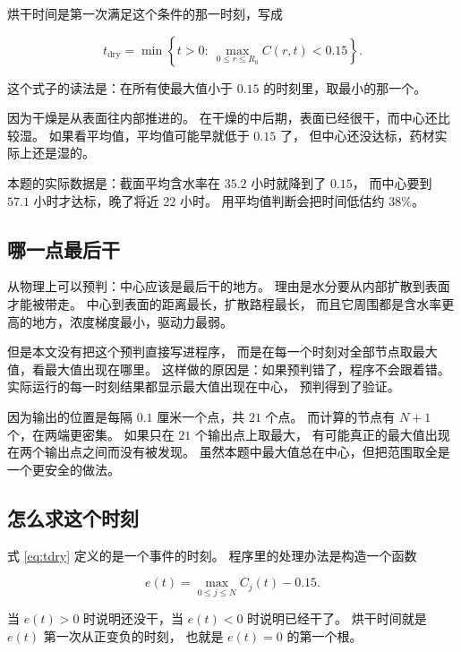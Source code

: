 烘干时间是第一次满足这个条件的那一时刻，写成

\begin{equation}
t_{\mathrm{dry}}=\min\left\{t>0:\ \max_{0\le r\le R_0}C(r,t)<0.15\right\}.
\label{eq:tdry}
\end{equation}

这个式子的读法是：在所有使最大值小于 $0.15$ 的时刻里，取最小的那一个。

因为干燥是从表面往内部推进的。
在干燥的中后期，表面已经很干，而中心还比较湿。
如果看平均值，平均值可能早就低于 $0.15$ 了，
但中心还没达标，药材实际上还是湿的。

本题的实际数据是：截面平均含水率在 $35.2$ 小时就降到了 $0.15$，
而中心要到 $57.1$ 小时才达标，晚了将近 $22$ 小时。
用平均值判断会把时间低估约 $38\%$。

\subsection{哪一点最后干}

从物理上可以预判：中心应该是最后干的地方。
理由是水分要从内部扩散到表面才能被带走。
中心到表面的距离最长，扩散路程最长，
而且它周围都是含水率更高的地方，浓度梯度最小，驱动力最弱。

但是本文没有把这个预判直接写进程序，
而是在每一个时刻对全部节点取最大值，看最大值出现在哪里。
这样做的原因是：如果预判错了，程序不会跟着错。
实际运行的每一时刻结果都显示最大值出现在中心，
预判得到了验证。

因为输出的位置是每隔 $0.1$ 厘米一个点，共 $21$ 个点。
而计算的节点有 $N+1$ 个，在两端更密集。
如果只在 $21$ 个输出点上取最大，
有可能真正的最大值出现在两个输出点之间而没有被发现。
虽然本题中最大值总在中心，但把范围取全是一个更安全的做法。

\subsection{怎么求这个时刻}

式 \eqref{eq:tdry} 定义的是一个事件的时刻。
程序里的处理办法是构造一个函数

\begin{equation}
e(t) = \max_{0\le j\le N}C_j(t) - 0.15 .
\end{equation}

当 $e(t)>0$ 时说明还没干，当 $e(t)<0$ 时说明已经干了。
烘干时间就是 $e(t)$ 第一次从正变负的时刻，
也就是 $e(t)=0$ 的第一个根。

